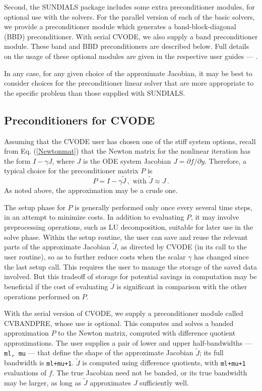 Second, the SUNDIALS package includes some extra preconditioner
modules, for optional use with the solvers.  For the parallel version
of each of the basic solvers, we provide a preconditioner module which
generates a band-block-diagonal (BBD) preconditioner.  With serial
CVODE, we also supply a band preconditioner module.  These band and
BBD preconditioners are described below.  Full details on the usage
of these optional modules are given in the respective user guides
--- \cite{HiSe:03a,TaHi:98,HiTa:99}.

In any case, for any given choice of the approximate Jacobian, it may
be best to consider choices for the preconditioner linear solver that
are more appropriate to the specific problem than those supplied with
SUNDIALS.

\subsection{Preconditioners for CVODE}

Assuming that the CVODE user has chosen one of the stiff system
options, recall from Eq. (\ref{Newtonmat}) that the Newton matrix for
the nonlinear iteration has the form $I - \gamma J$, where $J$ is the
ODE system Jacobian $J = \partial f / \partial y$.  Therefore, a
typical choice for the preconditioner matrix $P$ is
\begin{equation*}
  P = I - \gamma \tilde{J} \, , \mbox{ with } \tilde{J} \approx J \, . 
\end{equation*}
As noted above, the approximation may be a crude one.  

The setup phase for $P$ is generally performed only once every several
time steps, in an attempt to minimize costs.  In addition to
evaluating $P$, it may involve preprocessing operations, such as LU
decomposition, suitable for later use in the solve phase.  Within the
setup routine, the user can save and reuse the relevant parts of the
approximate Jacobian $\tilde{J}$, as directed by CVODE (in its call to
the user routine), so as to further reduce costs when the scalar
$\gamma$ has changed since the last setup call.  This requires the
user to manage the storage of the saved data involved.  But this
tradeoff of storage for potential savings in computation may be
beneficial if the cost of evaluating $\tilde{J}$ is significant in
comparison with the other operations performed on $P$.

With the serial version of CVODE, we supply a preconditioner module
called CVBANDPRE, whose use is optional.  This computes and solves a
banded approximation $P$ to the Newton matrix, computed with
difference quotient approximations.  The user supplies a pair of lower
and upper half-bandwidths --- {\tt ml, mu} --- that define the shape of
the approximate Jacobian $\tilde{J}$; its full bandwidth is
{\tt ml+mu+1}.  $\tilde{J}$ is computed using difference quotients,
with {\tt ml+mu+1} evaluations of $f$.  The true Jacobian need not be
banded, or its true bandwidth may be larger, as long as $\tilde{J}$
approximates $J$ sufficiently well.

